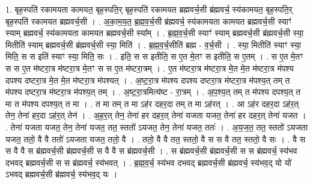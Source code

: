 \documentclass[17pt]{extarticle}
\begin{document}
1. बृह॒स्पति॑ रकामयता कामयत॒ बृह॒स्पति॒र् बृह॒स्पति॑ रकामयत ब्रह्मवर्च॒सी ब्र॑ह्मवर्च॒ स्य॑कामयत॒ बृह॒स्पति॒र् बृह॒स्पति॑ रकामयत ब्रह्मवर्च॒सी । . अ॒का॒म॒य॒त॒ ब्र॒ह्म॒व॒र्च॒सी ब्र॑ह्मवर्च॒ स्य॑कामयता कामयत ब्रह्मवर्च॒सी स्याꣳ॑ स्याम् ब्रह्मवर्च॒ स्य॑कामयता कामयत ब्रह्मवर्च॒सी स्या᳚म् । . ब्र॒ह्म॒व॒र्च॒सी स्याꣳ॑ स्याम् ब्रह्मवर्च॒सी ब्र॑ह्मवर्च॒सी स्या॒ मितीति॑ स्याम् ब्रह्मवर्च॒सी ब्र॑ह्मवर्च॒सी स्या॒ मिति॑ । . ब्र॒ह्म॒व॒र्च॒सीति॑ ब्रह्म - व॒र्च॒सी । . स्या॒ मितीति॑ स्याꣳ स्या॒ मिति॒ स स इति॑ स्याꣳ स्या॒ मिति॒ सः । . इति॒ स स इतीति॒ स ए॒त मे॒तꣳ स इतीति॒ स ए॒तम् । . स ए॒त मे॒तꣳ स स ए॒त म॑ष्टरा॒त्र म॑ष्टरा॒त्र मे॒तꣳ स स ए॒त म॑ष्टरा॒त्रम् । . ए॒त म॑ष्टरा॒त्र म॑ष्टरा॒त्र मे॒त मे॒त म॑ष्टरा॒त्र म॑पश्य दपश्य दष्टरा॒त्र मे॒त मे॒त म॑ष्टरा॒त्र म॑पश्यत् । . अ॒ष्ट॒रा॒त्र म॑पश्य दपश्य दष्टरा॒त्र म॑ष्टरा॒त्र म॑पश्य॒त् तम् त म॑पश्य दष्टरा॒त्र म॑ष्टरा॒त्र म॑पश्य॒त् तम् । . अ॒ष्ट॒रा॒त्रमित्य॑ष्ट - रा॒त्रम् । . अ॒प॒श्य॒त् तम् त म॑पश्य दपश्य॒त् त मा त म॑पश्य दपश्य॒त् त मा । . त मा तम् त मा ऽह॑र दहर॒दा तम् त मा ऽह॑रत् । . आ ऽह॑र दहर॒दा ऽह॑र॒त् तेन॒ तेना॑ हर॒दा ऽह॑र॒त् तेन॑ । . अ॒ह॒र॒त् तेन॒ तेना॑ हर दहर॒त् तेना॑ यजता यजत॒ तेना॑ हर दहर॒त् तेना॑ यजत । . तेना॑ यजता यजत॒ तेन॒ तेना॑ यजत॒ तत॒ स्ततो॑ ऽयजत॒ तेन॒ तेना॑ यजत॒ ततः॑ । . अ॒य॒ज॒त॒ तत॒ स्ततो॑ ऽयजता यजत॒ ततो॒ वै वै ततो॑ ऽयजता यजत॒ ततो॒ वै । . ततो॒ वै वै तत॒ स्ततो॒ वै स स वै तत॒ स्ततो॒ वै सः । . वै स स वै वै स ब्र॑ह्मवर्च॒सी ब्र॑ह्मवर्च॒सी स वै वै स ब्र॑ह्मवर्च॒सी । . स ब्र॑ह्मवर्च॒सी ब्र॑ह्मवर्च॒सी स स ब्र॑ह्मवर्च॒ स्य॑भव दभवद् ब्रह्मवर्च॒सी स स ब्र॑ह्मवर्च॒ स्य॑भवत् । . ब्र॒ह्म॒व॒र्च॒ स्य॑भव दभवद् ब्रह्मवर्च॒सी ब्र॑ह्मवर्च॒ स्य॑भव॒द् यो यो॑ ऽभवद् ब्रह्मवर्च॒सी ब्र॑ह्मवर्च॒ स्य॑भव॒द् यः । \newline
\end{document}
